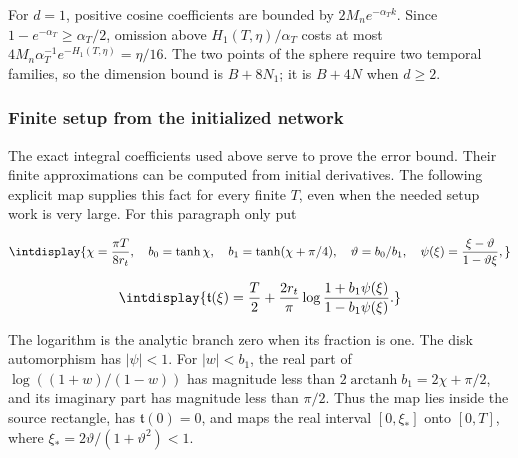
For \(d=1\), positive cosine coefficients are bounded by \(2M_ne^{-\alpha_Tk}\). Since \(1-e^{-\alpha_T}\ge\alpha_T/2\), omission above \(H_1(T,\allowbreak \eta)/\alpha_T\) costs at most \(4M_n\alpha_T^{-1}e^{-H_1(T,\allowbreak \eta)}=\eta/16\). The two points of the sphere require two temporal families, so the dimension bound is \(B+8N_1\); it is \(B+4N\) when \(d\ge2\).


\subsubsection{Finite setup from the initialized network}
\label{int:compact-initial-jet-proof}
\label{int:harmonic-initial-jet-proof}


The exact integral coefficients used above serve to prove the error bound. Their finite approximations can be computed from initial derivatives. The following explicit map supplies this fact for every finite \(T\), even when the needed setup work is very large. For this paragraph only put


\begingroup\renewcommand{\theHequation}{intdisplay.562}
\begin{equation*}
\intdisplay{
\chi=\frac{\pi T}{8r_t},\quad b_0=\tanh\chi,\quad
b_1=\tanh(\chi+\pi/4),\quad \vartheta=b_0/b_1,
\quad \psi(\xi)=\frac{\xi-\vartheta}{1-\vartheta\xi},
}
\end{equation*}
\endgroup

\begingroup\renewcommand{\theHequation}{intdisplay.563}
\begin{equation}
\intdisplay{
\mathfrak t(\xi)=\frac T2+\frac{2r_t}{\pi}
             \log\frac{1+b_1\psi(\xi)}{1-b_1\psi(\xi)}.
}
\label{int:eq-0234-harmonic-initial-jet-map}
\end{equation}
\endgroup


The logarithm is the analytic branch zero when its fraction is one. The disk automorphism has \(|\psi|<1\). For \(|w|<b_1\), the real part of \(\log((1+w)/(1-w))\) has magnitude less than \(2\operatorname{arctanh}b_1=2\chi+\pi/2\), and its imaginary part has magnitude less than \(\pi/2\). Thus the map lies inside the source rectangle, has \(\mathfrak t(0)=0\), and maps the real interval \([0,\allowbreak \xi_*]\) onto \([0,\allowbreak T]\), where \(\xi_*=2\vartheta/(1+\vartheta^2)<1\).


